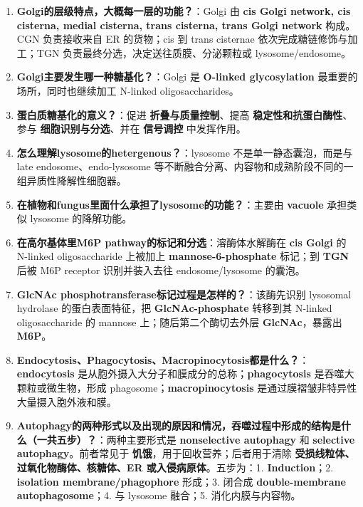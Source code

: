 \documentclass[12pt,fontset=none]{ctexart}
\begin{document}
\begin{enumerate}
\item \textbf{Golgi的层级特点，大概每一层的功能？}：Golgi 由 \textbf{cis Golgi network, cis cisterna, medial cisterna, trans cisterna, trans Golgi network} 构成。CGN 负责接收来自 ER 的货物；cis 到 trans cisternae 依次完成糖链修饰与加工；TGN 负责最终分选，决定送往质膜、分泌颗粒或 lysosome/endosome。

\item \textbf{Golgi主要发生哪一种糖基化？}：Golgi 是 \textbf{O-linked glycosylation} 最重要的场所，同时也继续加工 N-linked oligosaccharides。

\item \textbf{蛋白质糖基化的意义？}：促进 \textbf{折叠与质量控制}、提高 \textbf{稳定性和抗蛋白酶性}、参与 \textbf{细胞识别与分选}、并在 \textbf{信号调控} 中发挥作用。

\item \textbf{怎么理解lysosome的hetergenous？}：lysosome 不是单一静态囊泡，而是与 late endosome、endo-lysosome 等不断融合分离、内容物和成熟阶段不同的一组异质性降解性细胞器。

\item \textbf{在植物和fungus里面什么承担了lysosome的功能？}：主要由 \textbf{vacuole} 承担类似 lysosome 的降解功能。

\item \textbf{在高尔基体里M6P pathway的标记和分选}：溶酶体水解酶在 \textbf{cis Golgi} 的 N-linked oligosaccharide 上被加上 \textbf{mannose-6-phosphate} 标记；到 \textbf{TGN} 后被 M6P receptor 识别并装入去往 endosome/lysosome 的囊泡。

\item \textbf{GlcNAc phosphotransferase标记过程是怎样的？}：该酶先识别 lysosomal hydrolase 的蛋白表面特征，把 \textbf{GlcNAc-phosphate} 转移到其 N-linked oligosaccharide 的 mannose 上；随后第二个酶切去外层 \textbf{GlcNAc}，暴露出 \textbf{M6P}。

\item \textbf{Endocytosis、Phagocytosis、Macropinocytosis都是什么？}：\textbf{endocytosis} 是从胞外摄入大分子和膜成分的总称；\textbf{phagocytosis} 是吞噬大颗粒或微生物，形成 phagosome；\textbf{macropinocytosis} 是通过膜褶皱非特异性大量摄入胞外液和膜。

\item \textbf{Autophagy的两种形式以及出现的原因和情况，吞噬过程中形成的结构是什么（一共五步）？}：两种主要形式是 \textbf{nonselective autophagy} 和 \textbf{selective autophagy}。前者常见于 \textbf{饥饿}，用于回收营养；后者用于清除 \textbf{受损线粒体、过氧化物酶体、核糖体、ER 或入侵病原体}。五步为：1. \textbf{Induction}；2. \textbf{isolation membrane/phagophore} 形成；3. 闭合成 \textbf{double-membrane autophagosome}；4. 与 lysosome 融合；5. 消化内膜与内容物。

\end{enumerate}
\end{document}
